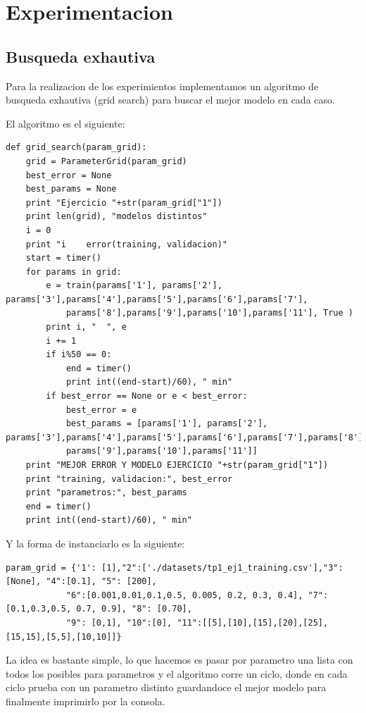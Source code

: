 \section{Experimentacion}
\subsection{Busqueda exhautiva}
Para la realizacion de los experimientos implementamos un algoritmo de busqueda exhautiva (grid search) para buscar el mejor modelo en cada caso. 

El algoritmo es el siguiente:

\begin{lstlisting}[caption=grid\_search]
def grid_search(param_grid):
	grid = ParameterGrid(param_grid)
	best_error = None
	best_params = None
	print "Ejercicio "+str(param_grid["1"])
	print len(grid), "modelos distintos"
	i = 0
	print "i 	error(training, validacion)"
	start = timer()
	for params in grid:
	    e = train(params['1'], params['2'], params['3'],params['4'],params['5'],params['6'],params['7'],
	    	params['8'],params['9'],params['10'],params['11'], True )
	    print i, "	", e
	    i += 1
	    if i%50 == 0:
	    	end = timer()
	    	print int((end-start)/60), " min"
	    if best_error == None or e < best_error:
	    	best_error = e
	    	best_params = [params['1'], params['2'], params['3'],params['4'],params['5'],params['6'],params['7'],params['8'],
	    	params['9'],params['10'],params['11']]
	print "MEJOR ERROR Y MODELO EJERCICIO "+str(param_grid["1"])
	print "training, validacion:", best_error
	print "parametros:", best_params
	end = timer()
	print int((end-start)/60), " min"
\end{lstlisting}

Y la forma de instanciarlo es la siguiente:

\begin{lstlisting}[caption=Instanciacion]
param_grid = {'1': [1],"2":['./datasets/tp1_ej1_training.csv'],"3": [None], "4":[0.1], "5": [200], 
			"6":[0.001,0.01,0.1,0.5, 0.005, 0.2, 0.3, 0.4], "7":[0.1,0.3,0.5, 0.7, 0.9], "8": [0.70], 
			"9": [0,1], "10":[0], "11":[[5],[10],[15],[20],[25],[15,15],[5,5],[10,10]]}
\end{lstlisting}

La idea es bastante simple, lo que hacemos es pasar por parametro una lista con todos los posibles para parametros y el algoritmo corre un ciclo, donde en cada ciclo prueba con un parametro distinto guardandoce el mejor modelo para finalmente imprimirlo por la consola.

